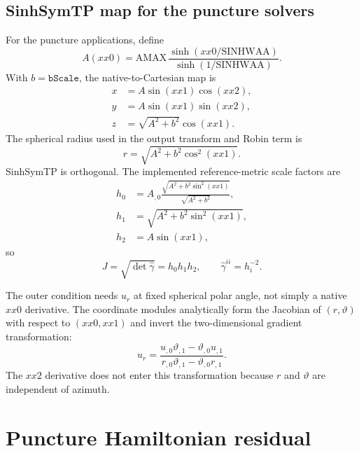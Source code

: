 \documentclass[11pt]{article}
\begin{document}
\subsection{SinhSymTP map for the puncture solvers}

For the puncture applications, define
\begin{equation}
 A(xx0)=\mathrm{AMAX}\,
 \frac{\sinh(xx0/\mathrm{SINHWAA})}
      {\sinh(1/\mathrm{SINHWAA})}.
\end{equation}
With $b=\texttt{bScale}$, the native-to-Cartesian map is
\begin{align}
 x &= A\sin(xx1)\cos(xx2),\\
 y &= A\sin(xx1)\sin(xx2),\\
 z &= \sqrt{A^2+b^2}\cos(xx1).
 \label{eq:sinh-symtp-cart}
\end{align}
The spherical radius used in the output transform and Robin term is
\begin{equation}
 r=\sqrt{A^2+b^2\cos^2(xx1)}.
\end{equation}
SinhSymTP is orthogonal.  The implemented reference-metric scale factors are
\begin{align}
 h_0 &= A_{,0}
       \frac{\sqrt{A^2+b^2\sin^2(xx1)}}{\sqrt{A^2+b^2}},\\
 h_1 &= \sqrt{A^2+b^2\sin^2(xx1)},\\
 h_2 &= A\sin(xx1),
\end{align}
so
\begin{equation}
 J=\sqrt{\det\hat\gamma}=h_0h_1h_2,
 \qquad \hat\gamma^{ii}=h_i^{-2}.
 \label{eq:sinh-symtp-jacobian}
\end{equation}

The outer condition needs $u_r$ at fixed spherical polar angle, not simply a
native $xx0$ derivative.  The coordinate modules analytically form the
Jacobian of $(r,\vartheta)$ with respect to $(xx0,xx1)$ and invert the
two-dimensional gradient transformation:
\begin{equation}
 u_r=
 \frac{u_{,0}\vartheta_{,1}-\vartheta_{,0}u_{,1}}
      {r_{,0}\vartheta_{,1}-\vartheta_{,0}r_{,1}}.
 \label{eq:spherical-radial-derivative}
\end{equation}
The $xx2$ derivative does not enter this transformation because $r$ and
$\vartheta$ are independent of azimuth.

\section{Puncture Hamiltonian residual}
\end{document}
